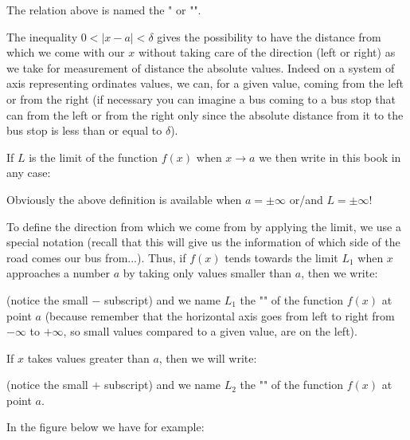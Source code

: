 	The relation above is named the " or "".
	
	The inequality $0<|x-a|<\delta$ gives the possibility to have the distance from which we come with our $x$ without taking care of the direction (left or right) as we take for measurement of distance the absolute values. Indeed on a system of axis representing ordinates values, we can, for a given value, coming from the left or from the right (if necessary you can imagine a bus coming to a bus stop that can from the left or from the right only since the absolute distance from it to the bus stop is less than or equal to $\delta$).
	
	If $L$ is the limit of the function $f(x)$ when $x\rightarrow a$ we then write in this book in any case:
	
	Obviously the above definition is available when $a=\pm \infty$ or/and $L=\pm \infty$!	
	
	To define the direction from which we come from by applying the limit, we use a special notation (recall that this will give us the information of which side of the road comes our bus from...). Thus, if $f(x)$ tends towards the limit $L_1$ when $x$ approaches a number $a$ by taking only values smaller than $a$, then we write:
	
	(notice the small $-$ subscript) and we name $L_1$ the "" of the function $f(x)$ at point $a$ (because remember that the horizontal axis goes from left to right from $-\infty$ to $+\infty$, so small values compared to a given value, are on the left).
	
	If $x$ takes values greater than $a$, then we will write:
	
	(notice the small $+$ subscript) and we name $L_2$ the "" of the function $f(x)$ at point $a$.
	
	In the figure below we have for example: 
	

